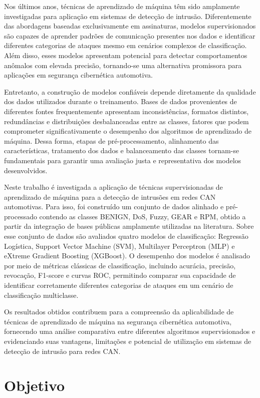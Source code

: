 Nos últimos anos, técnicas de aprendizado de máquina têm sido amplamente investigadas para aplicação em sistemas de detecção de intrusão. Diferentemente das abordagens baseadas exclusivamente em assinaturas, modelos supervisionados são capazes de aprender padrões de comunicação presentes nos dados e identificar diferentes categorias de ataques mesmo em cenários complexos de classificação. Além disso, esses modelos apresentam potencial para detectar comportamentos anômalos com elevada precisão, tornando-se uma alternativa promissora para aplicações em segurança cibernética automotiva.

Entretanto, a construção de modelos confiáveis depende diretamente da qualidade dos dados utilizados durante o treinamento. Bases de dados provenientes de diferentes fontes frequentemente apresentam inconsistências, formatos distintos, redundâncias e distribuições desbalanceadas entre as classes, fatores que podem comprometer significativamente o desempenho dos algoritmos de aprendizado de máquina. Dessa forma, etapas de pré-processamento, alinhamento das características, tratamento dos dados e balanceamento das classes tornam-se fundamentais para garantir uma avaliação justa e representativa dos modelos desenvolvidos.

Neste trabalho é investigada a aplicação de técnicas supervisionadas de aprendizado de máquina para a detecção de intrusões em redes CAN automotivas. Para isso, foi construído um conjunto de dados alinhado e pré-processado contendo as classes BENIGN, DoS, Fuzzy, GEAR e RPM, obtido a partir da integração de bases públicas amplamente utilizadas na literatura. Sobre esse conjunto de dados são avaliados quatro modelos de classificação: Regressão Logística, Support Vector Machine (SVM), Multilayer Perceptron (MLP) e eXtreme Gradient Boosting (XGBoost). O desempenho dos modelos é analisado por meio de métricas clássicas de classificação, incluindo acurácia, precisão, revocação, F1-score e curvas ROC, permitindo comparar sua capacidade de identificar corretamente diferentes categorias de ataques em um cenário de classificação multiclasse.

Os resultados obtidos contribuem para a compreensão da aplicabilidade de técnicas de aprendizado de máquina na segurança cibernética automotiva, fornecendo uma análise comparativa entre diferentes algoritmos supervisionados e evidenciando suas vantagens, limitações e potencial de utilização em sistemas de detecção de intrusão para redes CAN.


\section{Objetivo}

